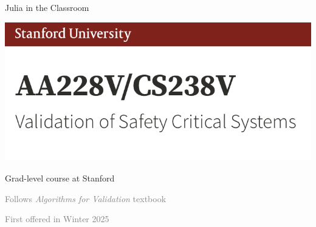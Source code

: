 \begin{frame}[fragile]{Julia in the Classroom} \pause

\centering
\includegraphics[width=0.5\linewidth]{media/aa228v.png}

{\footnotesize Grad-level course at Stanford}

\textcolor{gray}{\scriptsize Follows \textit{Algorithms for Validation} textbook}

\textcolor{gray}{\scriptsize First offered in Winter 2025}

\end{frame}